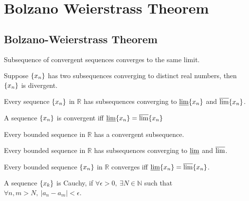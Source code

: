\chapter{Bolzano Weierstrass Theorem}
\section{Bolzano-Weierstrass Theorem}
	\begin{theorem}
		Subsequence of convergent sequences converges to the same limit.
	\end{theorem}

	\begin{remark}[Divergence]
		Suppose $\{x_n\}$ has two subsequences converging to distinct real numbers, then $\{x_n\}$ is divergent.
	\end{remark}

	\begin{theorem}
		Every sequence $\{x_n\}$ in $\mathbb{R}$ has subsequences converging to $\varliminf \{x_n\}$ and $\varlimsup \{x_n\}$.
	\end{theorem}

	\begin{remark}
		A sequence $\{x_n\}$ is convergent iff $\varliminf \{x_n\} = \varlimsup \{x_n\}$
	\end{remark}

	\begin{theorem}
		Every bounded sequence in $\mathbb{R}$ has a convergent subsequence.
	\end{theorem}

	\begin{remark}
		Every bounded sequence in $\mathbb{R}$ has subsequences converging to $\varliminf$ and $\varlimsup$. \cite{aliprantis}
	\end{remark}

	\begin{theorem}
		Every bounded sequence $\{x_n\}$ in $\mathbb{R}$ converges iff $\varliminf \{x_n\} = \varlimsup \{x_n\}$.
	\end{theorem}

	\begin{definition}[cauchy]
		A sequence $\{x_k\}$ is Cauchy, if $\forall \epsilon > 0,\ \exists N \in \mathbb{N}$ such that $\forall n,m > N,\ |a_n-a_m|<\epsilon$.
	\end{definition}

